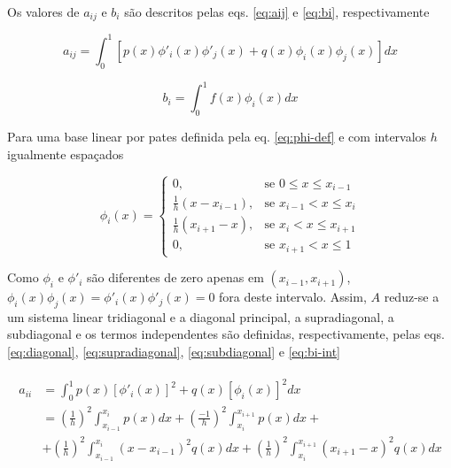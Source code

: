 \documentclass[a4,12pt]{horizon-theme}
\begin{document}
Os valores de $a_{ij}$ e $b_i$ são descritos pelas eqs. \eqref{eq:aij} e \eqref{eq:bi}, respectivamente

\begin{equation}\label{eq:aij}
  \displaystyle a_{ij} = \int_0^1 [p(x)\phi'_i(x)\phi'_j(x) + q(x)\phi_i(x)\phi_j(x)]dx
\end{equation}

\begin{equation}\label{eq:bi}
  b_i = \int_0^1 f(x)\phi_i(x) dx
\end{equation}

Para uma base linear por pates definida pela eq. \eqref{eq:phi-def} e com intervalos $h$ igualmente espaçados

\begin{equation}\label{eq:phi-def}
  \phi_i(x) =
  \begin{cases}
    0,                                     & \textrm{se}\,\, 0 \le x \le x_{i-1} \\
    \displaystyle\frac{1}{h}(x - x_{i-1}), & \textrm{se}\,\, x_{i-1} < x \le x_i \\
    \displaystyle\frac{1}{h}(x_{i+1} - x), & \textrm{se}\,\, x_i < x \le x_{i+1} \\
    0,                                     & \textrm{se}\,\, x_{i+1} < x \le 1
  \end{cases}
\end{equation}

Como $\phi_i$ e $\phi'_i$ são diferentes de zero apenas em $(x_{i−1}, x_{i+1})$, $\phi_i(x)\phi_j(x) = \phi'_i(x)\phi'_j(x) = 0$ fora deste intervalo. Assim, $A$ reduz-se a um sistema linear tridiagonal e a diagonal principal, a supradiagonal, a subdiagonal e os termos independentes são definidas, respectivamente, pelas eqs. \eqref{eq:diagonal}, \eqref{eq:supradiagonal}, \eqref{eq:subdiagonal} e \eqref{eq:bi-int}

\begin{align}\label{eq:diagonal}
  \begin{split}
    a_{ii} & = \int_0^1 {p(x)[\phi'_i(x)]^2 + q(x)[\phi_i(x)]^2}dx\\
    {} & = \left(\frac{1}{h}\right)^2 \int_{x_{i-1}}^{x_i} p(x)dx + \left(\frac{-1}{h}\right)^2 \int_{x_i}^{x_{i+1}} p(x)dx +\\
    {} & + \left(\frac{1}{h}\right)^2 \int_{x_{i-1}}^{x_i} (x - x_{i-1})^2q(x)dx + \left(\frac{1}{h}\right)^2 \int_{x_i}^{x_{i+1}} (x_{i+1} - x)^2q(x)dx
  \end{split}
\end{align}
\end{document}
